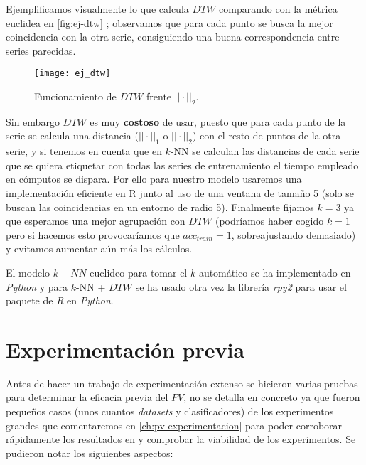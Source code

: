 Ejemplificamos visualmente lo que calcula $DTW$ comparando con la métrica euclidea en \autoref{fig:ej-dtw} \cite{volny2012employing}; observamos que para cada punto se busca la mejor coincidencia con la otra serie, consiguiendo una buena correspondencia entre series parecidas.

\begin{figure}[htbp]
  \centering
  \texttt{[image: ej\_dtw]}
  \caption{Funcionamiento de $DTW$ frente $||\cdot||_2$.}
  \label{fig:ej-dtw}
\end{figure}

Sin embargo $DTW$ es muy \textbf{costoso} de usar, puesto que para cada punto de la serie se calcula una distancia ($||\cdot||_1$ o $||\cdot||_2$) con el resto de puntos de la otra serie, y si tenemos en cuenta que en $k$-NN se calculan las distancias de cada serie que se quiera etiquetar con todas las series de entrenamiento el tiempo empleado en cómputos se dispara. Por ello para nuestro modelo usaremos una implementación eficiente en R \cite{leodolter2020dtw} junto al uso de una ventana de tamaño 5 (solo se buscan las coincidencias en un entorno de radio 5). Finalmente fijamos $k = 3$ ya que esperamos una mejor agrupación con $DTW$ (podríamos haber cogido $k=1$ pero si hacemos esto provocaríamos que $acc_{train} = 1$, sobreajustando demasiado) y evitamos aumentar aún más los cálculos.

El modelo $k-NN$ euclideo para tomar el $k$ automático se ha implementado en \emph{Python} y para $k$-NN + $DTW$ se ha usado otra vez la librería \emph{rpy2} para usar el paquete de \emph{R} en \emph{Python}.

\section{Experimentación previa}

Antes de hacer un trabajo de experimentación extenso se hicieron varias pruebas para determinar la eficacia previa del $PV$, no se detalla en concreto ya que fueron pequeños casos (unos cuantos \emph{datasets} y clasificadores) de los experimentos grandes que comentaremos en \autoref{ch:pv-experimentacion} para poder corroborar rápidamente los resultados en \cite{zhang2019perturbation} y comprobar la viabilidad de los experimentos. Se pudieron notar los siguientes aspectos:

